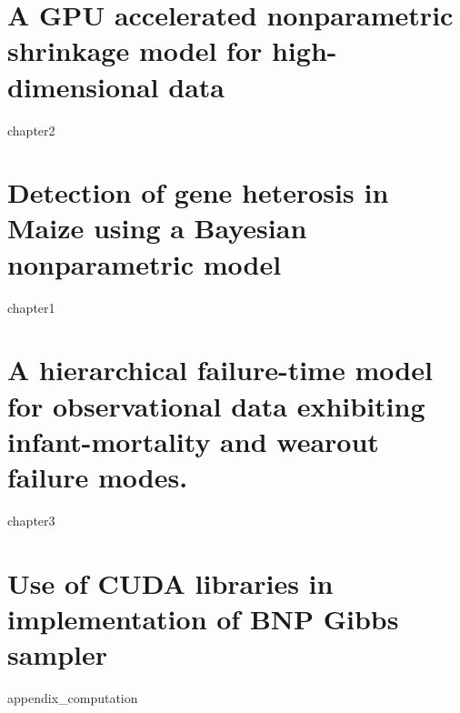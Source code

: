 \documentclass[11pt]{isuthesis}
\begin{document}


\tableofcontents
{} \cleardoublepage {}
{}
\listoftables
\cleardoublepage {} {}
\listoffigures

\newtoggle{thesis}
\toggletrue{thesis}

\cleardoublepage {}  %
\cleardoublepage {}         %



\newpage
{}



\chapter{A GPU accelerated nonparametric shrinkage
model for high-dimensional data}
{chapter2}

\chapter{Detection of gene heterosis in Maize using a Bayesian nonparametric model}
{chapter1}

\chapter{A hierarchical failure-time model for observational data exhibiting infant-mortality and wearout failure modes.}
{chapter3}


\appendixtitle
\appendix

\chapter{Use of CUDA libraries in implementation of BNP Gibbs sampler}
{appendix_computation}
\end{document}
